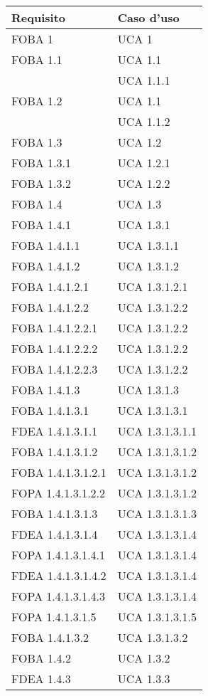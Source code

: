 \begin{longtable}{XX}
\toprule
\textbf{Requisito} & \textbf{Caso d'uso}\\
\midrule
FOBA 1&UCA 1\\
\midrule
FOBA 1.1&UCA 1.1\\
&UCA 1.1.1\\
\midrule
FOBA 1.2&UCA 1.1\\
&UCA 1.1.2\\
\midrule
FOBA 1.3&UCA 1.2\\
\midrule
FOBA 1.3.1&UCA 1.2.1\\
\midrule
FOBA 1.3.2&UCA 1.2.2\\
\midrule
FOBA 1.4&UCA 1.3\\
\midrule
FOBA 1.4.1&UCA 1.3.1\\
\midrule
FOBA 1.4.1.1&UCA 1.3.1.1\\
\midrule
FOBA 1.4.1.2&UCA 1.3.1.2\\
\midrule
FOBA 1.4.1.2.1&UCA 1.3.1.2.1\\
\midrule
FOBA 1.4.1.2.2&UCA 1.3.1.2.2\\
\midrule
FOBA 1.4.1.2.2.1&UCA 1.3.1.2.2\\
\midrule
FOBA 1.4.1.2.2.2&UCA 1.3.1.2.2\\
\midrule
FOBA 1.4.1.2.2.3&UCA 1.3.1.2.2\\
\midrule
FOBA 1.4.1.3&UCA 1.3.1.3\\
\midrule
FOBA 1.4.1.3.1&UCA 1.3.1.3.1\\
\midrule
FDEA 1.4.1.3.1.1&UCA 1.3.1.3.1.1\\
\midrule
FOBA 1.4.1.3.1.2&UCA 1.3.1.3.1.2\\
\midrule
FOBA 1.4.1.3.1.2.1&UCA 1.3.1.3.1.2\\
\midrule
FOPA 1.4.1.3.1.2.2&UCA 1.3.1.3.1.2\\
\midrule
FOBA 1.4.1.3.1.3&UCA 1.3.1.3.1.3\\
\midrule
FDEA 1.4.1.3.1.4&UCA 1.3.1.3.1.4\\
\midrule
FOPA 1.4.1.3.1.4.1&UCA 1.3.1.3.1.4\\
\midrule
FDEA 1.4.1.3.1.4.2&UCA 1.3.1.3.1.4\\
\midrule
FOPA 1.4.1.3.1.4.3&UCA 1.3.1.3.1.4\\
\midrule
FOPA 1.4.1.3.1.5&UCA 1.3.1.3.1.5\\
\midrule
FOBA 1.4.1.3.2&UCA 1.3.1.3.2\\
\midrule
FOBA 1.4.2&UCA 1.3.2\\
\midrule
FDEA 1.4.3&UCA 1.3.3\\

\end{longtable}
